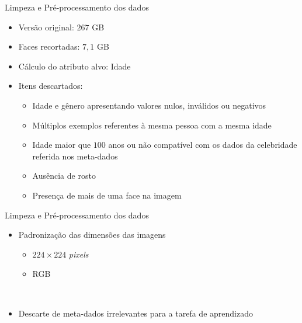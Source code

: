 \begin{frame}{Limpeza e Pré-processamento dos dados}
     \begin{itemize}
       \item Versão original: $267$ GB
       \item Faces recortadas: $7,1$ GB
       \ \ \newline
          \item Cálculo do atributo alvo: \alert{Idade}
          \ \ \newline
          \item Itens descartados:
          \begin{itemize}
               \item Idade e gênero apresentando valores nulos, inválidos ou negativos
               \item Múltiplos exemplos referentes à mesma pessoa com a mesma idade
               \item Idade maior que $100$ anos ou não compatível com os dados da celebridade referida nos meta-dados
               \item Ausência de rosto
               \item Presença de mais de uma face na imagem
          \end{itemize}
     \end{itemize}
\end{frame}

\begin{frame}{Limpeza e Pré-processamento dos dados}
     \begin{itemize}
          \item Padronização das dimensões das imagens
          \begin{itemize}
               \item $224 \times 224$ \emph{pixels}
               \item RGB
          \end{itemize}
          \  \ \newline
          \item Descarte de meta-dados irrelevantes para a tarefa de aprendizado
     \end{itemize}
\end{frame}

